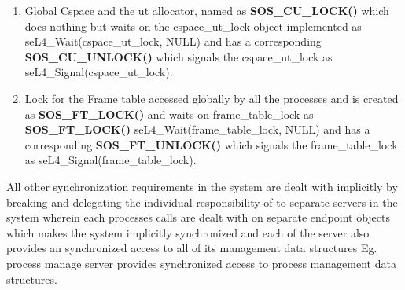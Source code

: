 \begin{enumerate}
    \item Global Cspace and the ut allocator, named as \textbf{SOS\_CU\_LOCK()} which does nothing but waits on the cspace\_ut\_lock object
    implemented as seL4\_Wait(cspace\_ut\_lock, NULL) and has a corresponding \textbf{SOS\_CU\_UNLOCK()} which signals the cspace\_ut\_lock as seL4\_Signal(cspace\_ut\_lock).
    \item Lock for the Frame table accessed globally by all the processes and is created as \textbf{SOS\_FT\_LOCK()} and waits on frame\_table\_lock 
    as \textbf{SOS\_FT\_LOCK()} seL4\_Wait(frame\_table\_lock, NULL) and has a corresponding \textbf{SOS\_FT\_UNLOCK()}  which signals the frame\_table\_lock as 
    seL4\_Signal(frame\_table\_lock).
  \end{enumerate}

\noindent All other synchronization requirements in the system are dealt with implicitly by breaking and delegating the individual responsibility of to separate servers
in the system wherein each processes calls are dealt with on separate endpoint objects which makes the system implicitly synchronized and each of the server also provides an 
synchronized access to all of its management data structures Eg. process manage server provides synchronized access to process management data structures.
